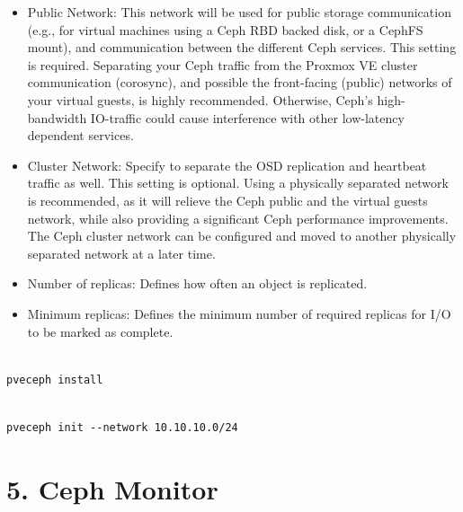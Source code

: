 \begin{itemize}[leftmargin=2cm]

	\item Public Network: This network will be used for public storage communication (e.g., for virtual machines using a Ceph RBD backed disk, or a CephFS mount), and communication between the different Ceph services. This setting is required. Separating your Ceph traffic from the Proxmox VE cluster communication (corosync), and possible the front-facing (public) networks of your virtual guests, is highly recommended. Otherwise, Ceph’s high-bandwidth IO-traffic could cause interference with other low-latency dependent services.

	\item Cluster Network: Specify to separate the OSD replication and heartbeat traffic as well. This setting is optional. Using a physically separated network is recommended, as it will relieve the Ceph public and the virtual guests network, while also providing a significant Ceph performance improvements. The Ceph cluster network can be configured and moved to another physically separated network at a later time.

\end{itemize}

\begin{itemize}[leftmargin=2cm]

	\item Number of replicas: Defines how often an object is replicated.

	\item Minimum replicas: Defines the minimum number of required replicas for I/O to be marked as complete.

\end{itemize}

\begin{lstlisting}

pveceph install

\end{lstlisting}

\begin{lstlisting}

pveceph init --network 10.10.10.0/24

\end{lstlisting}


\section{5. Ceph Monitor}

